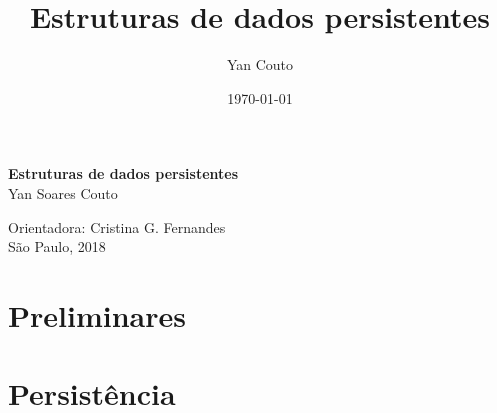 \documentclass[11pt,oneside,a4paper, openany]{book}
\title{Estruturas de dados persistentes}
\author{Yan Couto}
\date{\today}
\begin{document}
\frontmatter

\thispagestyle{empty}
\begin{center}
	\vspace*{2.3cm}
	\textbf{\huge{Estruturas de dados persistentes}}\\

	\vspace*{1cm}
	\Large{Yan Soares Couto}

	\vskip 1.8cm
	Orientadora: Cristina G. Fernandes\\

	\vspace{\fill}
	\normalsize{São Paulo, 2018}
\end{center}

\setcounter{tocdepth}{1}

\begingroup
\let\cleardoublepage\clearpage
\tableofcontents
\endgroup

\mainmatter
{}

\part{Preliminares}




\part{Persistência}













%
%
%



\end{document}
